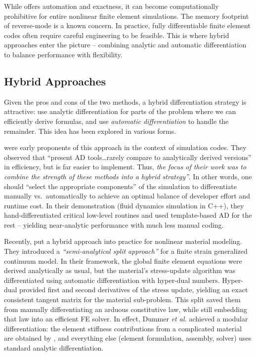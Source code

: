 While \autodiff{} offers automation and exactness, it can
become computationally prohibitive for entire nonlinear finite element
simulations. 
The memory footprint of reverse-mode \autodiff{} is a known concern. 
In practice, fully
differentiable finite element codes often require careful engineering to be feasible. 
This is where hybrid approaches enter the picture -- combining analytic and
automatic differentiation to balance performance with flexibility.

\subsection{Hybrid Approaches}

Given the pros and cons of the two methods, a hybrid
differentiation strategy is attractive: use analytic
differentiation for parts of the problem where we can efficiently 
derive formulas, and use \emph{automatic differentiation} to handle the remainder. 
This idea has been explored in various forms.

\cite{bartlett2008hybrid} were early proponents of this approach in the context of
simulation codes. 
They observed that ``present AD tools\ldots rarely
compare to analytically derived versions'' in efficiency, but \autodiff{} is
far easier to implement. 
Thus, \emph{the focus of their work
was to combine the strength of these methods into a hybrid
strategy''}. 
In other words, one should ``select the
appropriate components'' of the simulation to differentiate manually
vs.~automatically to achieve an optimal balance of developer effort
and runtime cost. 
In their demonstration (fluid dynamics simulation in
C++), they hand-differentiated critical low-level routines and used
template-based AD for the rest -- yielding near-analytic performance
with much less manual coding.

Recently, \cite{dummer2024robust} put a hybrid approach into practice for nonlinear material modeling. 
They introduced a \emph{``semi-analytical split approach''}
  for a finite strain generalized continuum model. 
  In their framework, the global finite element equations were derived
  analytically as usual, but the material's stress-update
  algorithm was differentiated using automatic differentiation
  with hyper-dual numbers. 
  Hyper-dual \autodiff{} provided first and
  second derivatives of the stress update,
  yielding an exact consistent tangent matrix for the material
  sub-problem. 
  This split saved them from manually
  differentiating an arduous constitutive law, while still embedding
  that law into an efficient FE solver. 
  In effect, Dummer \emph{et al.} achieved a modular differentiation: the element
  stiffness contributions from a complicated material are obtained by 
  \autodiff{}, and everything else (element formulation, assembly, solver) uses
  standard analytic differentiation.

